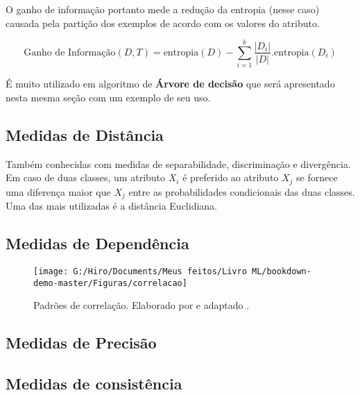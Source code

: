 \documentclass[
]{book}
\begin{document}
O ganho de informação portanto mede a redução da entropia (nesse caso) causada pela partição dos exemplos de acordo com os valores do atributo.

\begin{equation} 
  \mbox{Ganho de Informação}(D,T)=\mbox{entropia}(D)-\displaystyle \sum_{i=1}^k \frac{|D_i|}{|D|}. \mbox{entropia}(D_i) 
  \label{eq:ganhodeinf}
\end{equation}

É muito utilizado em algoritmo de \textbf{Árvore de decisão} que será apresentado nesta mesma seção com um exemplo de seu uso.

\hypertarget{medidas-de-distuxe2ncia}{%
\subsection{Medidas de Distância}\label{medidas-de-distuxe2ncia}}

Também conhecidas com medidas de separabilidade, discriminação e divergência. Em caso de duas classes, um atributo \(X_i\) é preferido ao atributo \(X_j\) se fornece uma diferença maior que \(X_j\) entre as probabilidades condicionais das duas classes. Uma das mais utilizadas é a distância Euclidiana.

\hypertarget{medidasdep}{%
\subsection{Medidas de Dependência}\label{medidasdep}}

\begin{figure}

{\centering \texttt{[image: G:/Hiro/Documents/Meus feitos/Livro ML/bookdown-demo-master/Figuras/correlacao]} 

}

\caption{Padrões de correlação. Elaborado por \citet{gujarati2011econometria} e adaptado \citet{theil1978}.}\label{fig:correlacao}
\end{figure}



\hypertarget{medidas-de-precisuxe3o}{%
\subsection{Medidas de Precisão}\label{medidas-de-precisuxe3o}}

\hypertarget{medidas-de-consistuxeancia}{%
\subsection{Medidas de consistência}\label{medidas-de-consistuxeancia}}
\end{document}
